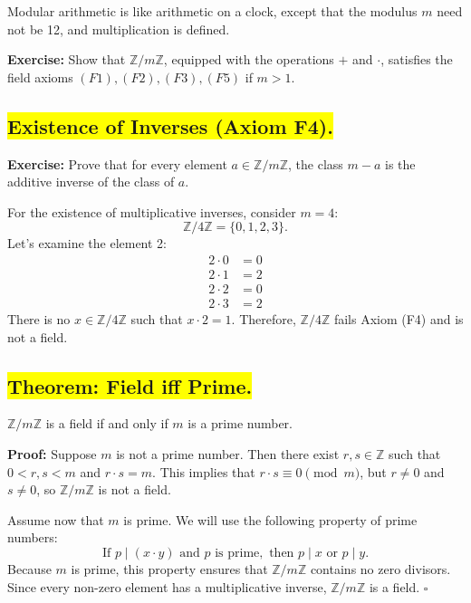 Modular arithmetic is like arithmetic on a clock, except that the modulus \( m \) need not be 12, and multiplication is defined.

\textbf{Exercise:} Show that \( \mathbb{Z}/m\mathbb{Z} \), equipped with the operations \( + \) and \( \cdot \), satisfies the field axioms \( (F1), (F2), (F3), (F5) \) if \( m > 1 \).

\subsection*{\colorbox{yellow}{Existence of Inverses (Axiom F4).}}

\textbf{Exercise:} Prove that for every element \( a \in \mathbb{Z}/m\mathbb{Z} \), the class \( m - a \) is the additive inverse of the class of \( a \).

For the existence of multiplicative inverses, consider \( m = 4 \):
\[
\mathbb{Z}/4\mathbb{Z} = \{0, 1, 2, 3\}.
\]
Let's examine the element 2:
\[
\begin{aligned}
    2 \cdot 0 &= 0 \\
    2 \cdot 1 &= 2 \\
    2 \cdot 2 &= 0 \\
    2 \cdot 3 &= 2
\end{aligned}
\]
There is no \( x \in \mathbb{Z}/4\mathbb{Z} \) such that \( x \cdot 2 = 1 \). Therefore, \( \mathbb{Z}/4\mathbb{Z} \) fails Axiom (F4) and is not a field.

\subsection*{\colorbox{yellow}{Theorem: Field iff Prime.}}

\( \mathbb{Z}/m\mathbb{Z} \) is a field if and only if \( m \) is a prime number.

\textbf{Proof:} Suppose \( m \) is not a prime number. Then there exist \( r, s \in \mathbb{Z} \) such that \( 0 < r, s < m \) and \( r \cdot s = m \). This implies that \( r \cdot s \equiv 0 \pmod{m} \), but \( r \neq 0 \) and \( s \neq 0 \), so \( \mathbb{Z}/m\mathbb{Z} \) is not a field.

Assume now that \( m \) is prime. We will use the following property of prime numbers: 
\[
\text{If } p \mid (x \cdot y) \text{ and } p \text{ is prime}, \text{ then } p \mid x \text{ or } p \mid y.
\]
Because \( m \) is prime, this property ensures that \( \mathbb{Z}/m\mathbb{Z} \) contains no zero divisors. Since every non-zero element has a multiplicative inverse, \( \mathbb{Z}/m\mathbb{Z} \) is a field. \(\square\)
